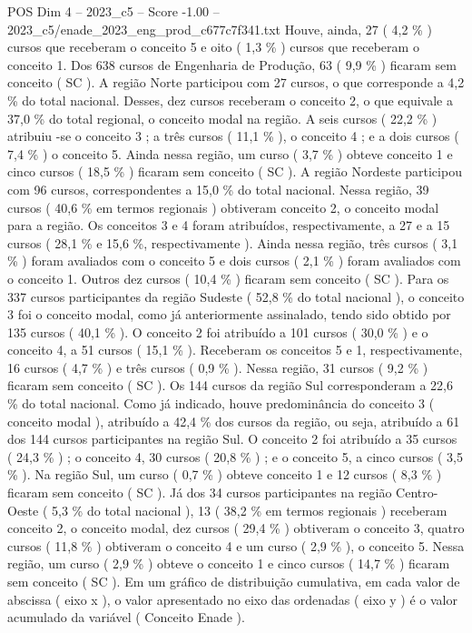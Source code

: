 \begin{textsample}{POS Dim 4 – 2023\_c5 – Score -1.00 – 2023\_c5/enade\_2023\_eng\_prod\_c677c7f341.txt}
Houve, ainda, 27 ( 4,2 \% ) cursos que receberam o conceito 5 e oito ( 1,3 \% ) cursos que receberam o conceito 1.
Dos 638 cursos de Engenharia de Produção, 63 ( 9,9 \% ) ficaram sem conceito ( SC ).
A região Norte participou com 27 cursos, o que corresponde a 4,2 \% do total nacional.
Desses, dez cursos receberam o conceito 2, o que equivale a 37,0 \% do total regional, o conceito modal na região.
A seis cursos ( 22,2 \% ) atribuiu -se o conceito 3 ; a três cursos ( 11,1 \% ), o conceito 4 ; e a dois cursos ( 7,4 \% ) o conceito 5.
Ainda nessa região, um curso ( 3,7 \% ) obteve conceito 1 e cinco cursos ( 18,5 \% ) ficaram sem conceito ( SC ).
A região Nordeste participou com 96 cursos, correspondentes a 15,0 \% do total nacional.
Nessa região, 39 cursos ( 40,6 \% em termos regionais ) obtiveram conceito 2, o conceito modal para a região.
Os conceitos 3 e 4 foram atribuídos, respectivamente, a 27 e a 15 cursos ( 28,1 \% e 15,6 \%, respectivamente ).
Ainda nessa região, três cursos ( 3,1 \% ) foram avaliados com o conceito 5 e dois cursos ( 2,1 \% ) foram avaliados com o conceito 1.
Outros dez cursos ( 10,4 \% ) ficaram sem conceito ( SC ).
Para os 337 cursos participantes da região Sudeste ( 52,8 \% do total nacional ), o conceito 3 foi o conceito modal, como já anteriormente assinalado, tendo sido obtido por 135 cursos ( 40,1 \% ).
O conceito 2 foi atribuído a 101 cursos ( 30,0 \% ) e o conceito 4, a 51 cursos ( 15,1 \% ).
Receberam os conceitos 5 e 1, respectivamente, 16 cursos ( 4,7 \% ) e três cursos ( 0,9 \% ).
Nessa região, 31 cursos ( 9,2 \% ) ficaram sem conceito ( SC ).
Os 144 cursos da região Sul corresponderam a 22,6 \% do total nacional.
Como já indicado, houve predominância do conceito 3 ( conceito modal ), atribuído a 42,4 \% dos cursos da região, ou seja, atribuído a 61 dos 144 cursos participantes na região Sul.
O conceito 2 foi atribuído a 35 cursos ( 24,3 \% ) ; o conceito 4, 30 cursos ( 20,8 \% ) ; e o conceito 5, a cinco cursos ( 3,5 \% ).
Na região Sul, um curso ( 0,7 \% ) obteve conceito 1 e 12 cursos ( 8,3 \% ) ficaram sem conceito ( SC ).
Já dos 34 cursos participantes na região Centro-Oeste ( 5,3 \% do total nacional ), 13 ( 38,2 \% em termos regionais ) receberam conceito 2, o conceito modal, dez cursos ( 29,4 \% ) obtiveram o conceito 3, quatro cursos ( 11,8 \% ) obtiveram o conceito 4 e um curso ( 2,9 \% ), o conceito 5.
Nessa região, um curso ( 2,9 \% ) obteve o conceito 1 e cinco cursos ( 14,7 \% ) ficaram sem conceito ( SC ).
Em um gráfico de distribuição cumulativa, em cada valor de abscissa ( eixo x ), o valor apresentado no eixo das ordenadas ( eixo y ) é o valor acumulado da variável ( Conceito Enade ).

\end{textsample}
